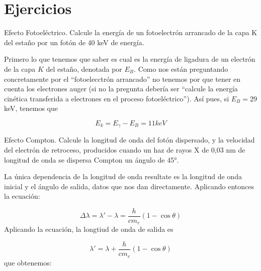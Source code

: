 \section*{Ejercicios}


\begin{Ejercicio}{Efecto Fotoeléctrico.}
    Calcule la energía de un fotoelectrón arrancado de la capa K del estaño por un fotón de 40 keV de energía.
\end{Ejercicio}

Primero lo que tenemos que saber es cual es la energía de ligadura de un electrón de la capa $K$ del estaño, denotada por $E_B$. Como nos están preguntando concretamente por el ``fotoelecctrón arrancado'' no tenemos por que tener en cuenta los electrones auger (si no la pregunta debería ser ``calcule la energía cinética transferida a electrones en el proceso fotoeléctrico''). Así pues, si $E_B=29$ keV, tenemos que 

\begin{equation}
    E_k = E_{\gamma} - E_B = 11 \unit{keV}
\end{equation}



\begin{Ejercicio}{Efecto Compton.}
    Calcule la longitud de onda del fotón dispersado, y la velocidad del electrón de retroceso, producidos cuando un haz de rayos X de 0,03 nm de longitud de onda se dispersa Compton un ángulo de 45°.
\end{Ejercicio}

La única dependencia de la longitud de onda resultate es la longitud de onda inicial y el ángulo de salida, datos que nos dan directamente. Aplicando entonces la ecuación: 

\begin{equation}
    \Delta \lambda = \lambda'-\lambda = \frac{h}{cm_e}(1-\cos \theta) 
\end{equation}
Aplicando la ecuación, la longtiud de onda de salida es

\begin{equation}
    \lambda' = \lambda + \frac{h}{cm_e} (1-\cos \theta)
\end{equation}
que obtenemos: 

